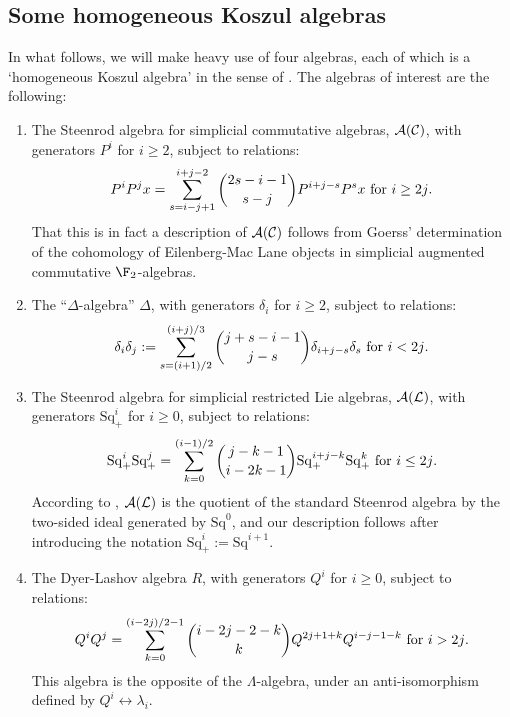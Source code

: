 \documentclass[11pt]{article}
\renewcommand{\Q}{Q}
\newcommand{\SqShift}{\Sq_{+}}
\newcommand{\Sq}{\mathrm{Sq}}
\newcommand{\LieSteen}{\calA(\calL)}
\newcommand{\CommSteen}{\calA(\calC)}
\newcommand{\deltaAlgebra}{\Delta}
\newcommand{\DyerLashov}{R}
\begin{document}
\begin{Frontmatter}
\tableofcontents\newpage
\end{Frontmatter}







\begin{SteenrodAlgebrasAndTheirKoszulDuals}
\section{Some homogeneous Koszul algebras}
In what follows, we will make heavy use of four algebras, each of which is a `homogeneous Koszul algebra' in the sense of \cite{PriddyKoszul.pdf}. The algebras of interest are the following:
\begin{enumerate}\squishlist
\setlength{\parindent}{.25in}
\item The Steenrod algebra for simplicial commutative algebras, $\CommSteen$, with generators $P^i$ for $i\geq2$, subject to relations:
\[P^iP^jx=\sum_{s=i-j+1}^{i+j-2}{2s-i-1\choose s-j}P^{i+j-s}P^sx\textup{ for $i\geq2j$}.\]
That this is in fact a description of $\CommSteen$ follows from Goerss' determination \cite[p.14]{MR1089001} of the cohomology of Eilenberg-Mac Lane objects in simplicial augmented commutative $\F_2$-algebras.

\item The ``$\Delta$-algebra'' $\deltaAlgebra$, with generators $\delta_i$ for $i\geq2$, subject to relations:
\[\delta_i\delta_j:=\sum_{s=(i+1)/2}^{(i+j)/3}{j+s-i-1\choose j-s}\delta_{i+j-s}\delta_s\textup{ for $i<2j$.}\]
\item The Steenrod algebra for simplicial restricted Lie algebras, $\LieSteen$, with generators $\SqShift^i$ for $i\geq0$, subject to relations:
\[\SqShift^i\SqShift^j=\sum_{k=0}^{(i-1)/2}{j-k-1\choose i-2k-1}\SqShift^{i+j-k}\SqShift^k\textup{\ for $i\leq2j$.}\]
According to \cite[\S7]{PriddySimplicialLie.pdf}, $\LieSteen$ is the quotient of the standard Steenrod algebra by the two-sided ideal generated by $\Sq^0$, and our description follows after introducing the notation $\SqShift^i:=\Sq^{i+1}$.
%

\item The Dyer-Lashov algebra $\DyerLashov$, with generators $\Q^i$ for $i\geq0$, subject to relations:
\[\Q^i\Q^j=\sum_{k=0}^{(i-2j)/2-1}{i-2j-2-k\choose k}\Q^{2j+1+k}\Q^{i-j-1-k}\textup{\ for $i>2j$.}\]
This algebra is the opposite of the $\Lambda$-algebra, under an anti-isomorphism defined by $Q^i\longleftrightarrow \lambda_i$.
\end{enumerate}

\end{SteenrodAlgebrasAndTheirKoszulDuals}
\end{document}

